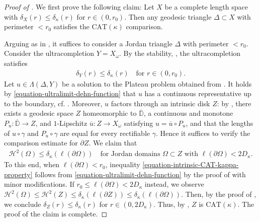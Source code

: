 \documentclass[a4paper,leqno]{amsart}
\numberwithin{equation}{section}
\theoremstyle{remark}
\theoremstyle{remark}
\begin{document}
\begin{proof}[Proof of ]
    We first prove the following claim: Let $X$ be a complete length space with $\delta_{X}(r) \leq \delta_{\kappa}(r)$ for $r \in (0,r_0)$. Then any geodesic triangle $\Delta \subset X$ with perimeter $< r_0$ satisfies the $\mathrm{CAT}(\kappa)$ comparison.

    Arguing as in \cite[Lemma 3.1]{Lyt:Wen:18:CAT}, it suffices to consider a Jordan triangle $\Delta$ with perimeter $< r_0$. Consider the ultracompletion $Y = X_\omega$. By the stability, , the ultracompletion satisfies
    \begin{align}\label{equation-ultralimit-dehn-function}
	   \delta_{Y}(r) \leq \delta_\kappa(r) \quad\text{for $r \in (0,r_0)$.}
    \end{align}
    Let $u \in \Lambda(\Delta, Y)$ be a solution to the Plateau problem obtained from . It holds by \eqref{equation-ultralimit-dehn-function} that $u$ has a continuous representative up to the boundary, cf. \cite[Theorem 9.1]{Lyt:Wen:17:areamini}. Moreover, $u$ factors through an intrinsic disk $Z$: by \cite[Theorem 1.1]{Lyt:Wen:18:intrinsic}, there exists a geodesic space $Z$ homeomorphic to $\overline{\mathbb{D}}$, a continuous and monotone $P_u \colon \overline{\mathbb{D}} \to Z$, and $1$-Lipschitz $\overline{u} \colon Z \to X_\omega$ satisfying $u = \overline{u} \circ P_u$, and that the lengths of $u \circ \gamma$ and $P_u \circ \gamma$ are equal for every rectifiable $\gamma$. Hence it suffices to verify the comparison estimate for $\partial Z$. We claim that
\begin{align}\label{equation-intrinsic-CAT-kappa-property}
    \mathcal{H}^{2}( \Omega ) \leq \delta_{\kappa}( \ell( \partial \Omega ) )
    \quad\text{for Jordan domains $\Omega \subset Z$ with $\ell( \partial \Omega ) < 2D_\kappa$.}
\end{align}
    To this end, when $\ell( \partial \Omega ) < r_0$, inequality \eqref{equation-intrinsic-CAT-kappa-property} follows from \eqref{equation-ultralimit-dehn-function} by the proof of \cite[Theorem 8.2]{Lyt:Wen:18:intrinsic} with minor modifications. If $r_0 \leq \ell( \partial \Omega ) < 2D_\kappa$ instead, we observe $\mathcal{H}^{2}(\Omega) \leq \mathcal{H}^{2}(Z) \leq \delta_\kappa( \ell(\partial Z) ) \leq \delta_{\kappa}( \ell(\partial \Omega) )$. Then, by the proof of \cite[Theorem 1.4]{Lyt:Wen:20}, we conclude    $\delta_{Z}(r) \leq \delta_{\kappa}(r)$ for $r \in (0,2D_\kappa)$. Thus, by \cite[Theorem 1.4]{Lyt:Wen:18:CAT}, $Z$ is $\mathrm{CAT}(\kappa)$. The proof of the claim is complete.


\end{proof}
\end{document}
